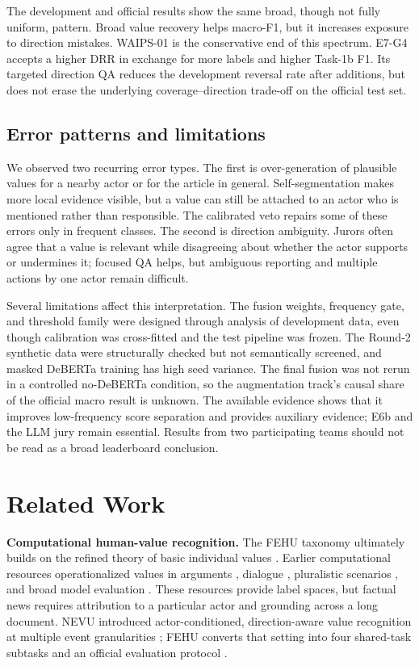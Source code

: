 \documentclass[sigconf,article,a4paper]{acmart}
\begin{document}
The development and official results show the same broad, though not fully
uniform, pattern. Broad value recovery helps macro-F1, but it increases
exposure to direction mistakes. WAIPS-01 is the conservative end of this
spectrum. E7-G4 accepts a higher DRR in exchange for more labels and higher
Task-1b F1. Its
targeted direction QA reduces the development reversal rate after additions,
but does not erase the underlying coverage--direction trade-off on the official
test set.

\subsection{Error patterns and limitations}

We observed two recurring error types. The first is over-generation of
plausible values for a nearby actor or for the article in general.
Self-segmentation makes more local evidence visible, but a value can still be
attached to an actor who is mentioned
rather than responsible. The calibrated veto repairs some of these errors only
in frequent classes. The second is direction ambiguity. Jurors often agree that
a value is relevant while disagreeing about whether the actor supports or
undermines it; focused QA helps, but ambiguous reporting and multiple actions
by one actor remain difficult.

Several limitations affect this interpretation. The fusion
weights, frequency gate, and threshold family were designed through analysis of
development data, even though calibration was cross-fitted and the test
pipeline was frozen. The Round-2 synthetic data were structurally checked but
not semantically screened, and masked DeBERTa training has high seed variance.
The final fusion was not rerun in a controlled no-DeBERTa
condition, so the augmentation track's causal share of the official macro
result is unknown. The available evidence shows that it improves low-frequency
score separation and provides auxiliary evidence; E6b and the LLM jury remain
essential. Results from two participating teams should not be read as
a broad leaderboard conclusion.

\FloatBarrier
\section{Related Work}

\textbf{Computational human-value recognition.}
The FEHU taxonomy ultimately builds on the refined theory of basic individual
values \cite{schwartz2012}. Earlier computational resources operationalized
values in arguments \cite{kiesel2022,valueEval2023}, dialogue
\cite{qiu2022}, pluralistic scenarios \cite{sorensen2024}, and broad model
evaluation \cite{ren2024}. These resources provide label spaces, but
factual news requires attribution to a particular actor and grounding across a
long document. NEVU introduced actor-conditioned, direction-aware value
recognition at multiple event granularities \cite{wangNevu2026}; FEHU converts
that setting into four shared-task subtasks and an official evaluation protocol
\cite{wangFehu2026}.
\end{document}
